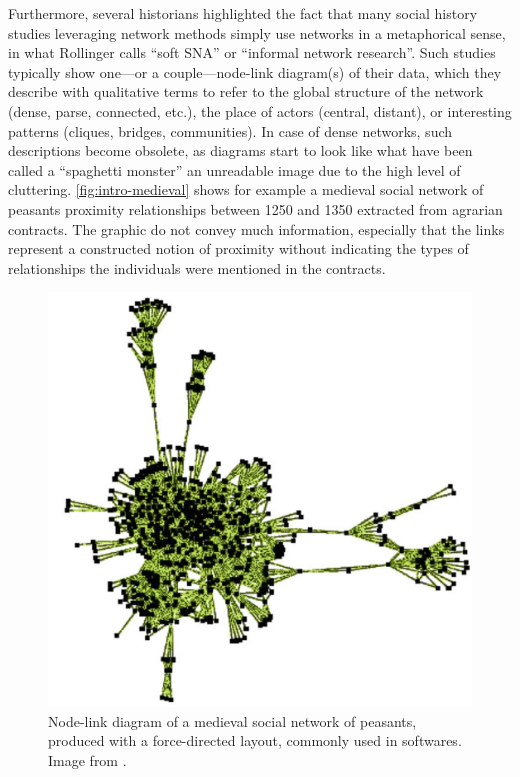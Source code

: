 Furthermore, several historians highlighted the fact that many social history studies leveraging network methods simply use networks in a metaphorical sense, in what Rollinger calls ``soft SNA'' or ``informal network research''\cite{rollingerProlegomenaProblemsPerspectives2020}.
Such studies typically show one---or a couple---node-link diagram(s) of their data, which they describe with qualitative terms\cite{lemercierQuantitativeMethodsHumanities2019} to refer to the global structure of the network (dense, parse, connected, etc.), the place of actors (central, distant), or interesting patterns (cliques, bridges, communities).
In case of dense networks, such descriptions become obsolete, as diagrams start to look like what have been called a ``spaghetti monster''\cite{collarNetworksArchaeologyPhenomena2015, lemercierQuantitativeMethodsHumanities2019} \ie an unreadable image due to the high level of cluttering.
\autoref{fig:intro-medieval} shows for example a medieval social network of peasants proximity relationships between 1250 and 1350 extracted from agrarian contracts.
The graphic do not convey much information, especially that the links represent a constructed notion of proximity without indicating the types of relationships the individuals were mentioned in the contracts.

\begin{figure}[!ht]
    \centering %
    \includegraphics[width=1\textwidth]{static/figures/RelatedWork/medievalNetwork}
    \caption{Node-link diagram of a medieval social network of peasants, produced with a force-directed layout, commonly used in \sna softwares. Image from \cite{bouletBatchKernelSOM2008}.}
    \label{fig:intro-medieval}
\end{figure}

